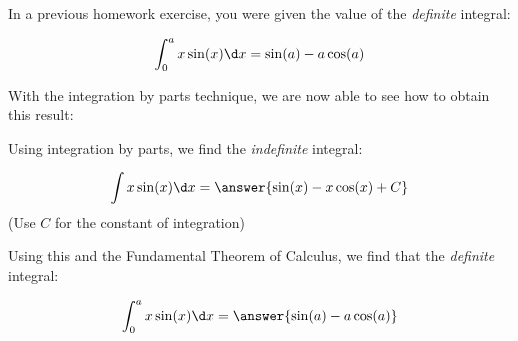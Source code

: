 \documentclass{ximera}
\author{Jim Talamo}
\begin{document}
\begin{exercise}
In a previous homework exercise, you were given the value of the \emph{definite} integral:

\[
\int_0^a x \sin(x) \d x = \sin(a)-a \cos(a)
\]

With the integration by parts technique, we are now able to see how to obtain this result:

Using integration by parts, we find the \emph{indefinite} integral:

\[
\int x \sin(x) \d x = \answer{\sin(x)-x \cos(x)+C}
\]
(Use $C$ for the constant of integration)

Using this and the Fundamental Theorem of Calculus, we find that the \emph{definite} integral:

\[
\int_0^a x \sin(x) \d x = \answer{\sin(a)-a \cos(a)}
\]

\end{exercise}
\end{document}
